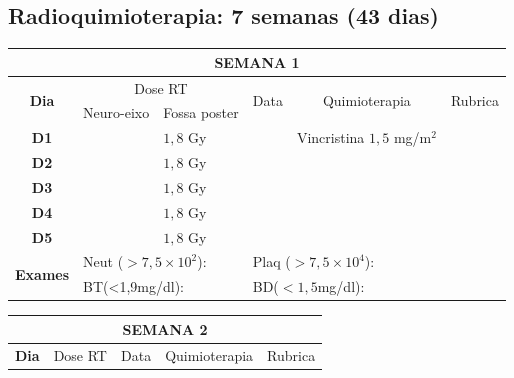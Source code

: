 \documentclass[11pt,a4paper,oldfontcommands]{memoir}
\begin{document}
\subsection{Radioquimioterapia: 7 semanas (43 dias)}

\begin{center}
\begin{tabular}{p{1cm}p{2cm}|p{2cm}|p{1cm}|p{4cm}|p{3cm}}
	\hline
	\multicolumn{6}{c}{\textbf{SEMANA 1}}\\
\hline
    \multicolumn{1}{c|}{\multirow{2}{*}{\textbf{Dia}}}&\multicolumn{2}{c|}{Dose RT}&\multicolumn{1}{c|}{\multirow{2}{*}{Data}}&\multicolumn{1}{c|}{\multirow{2}{*}{Quimioterapia}}&\multicolumn{1}{c}{\multirow{2}{*}{Rubrica}} \\
    \cline{2-3}
    \multicolumn{1}{c|}{\multirow{1}{*}{}}&{Neuro-eixo}&{Fossa poster}&& \\
	\hline
	\multicolumn{1}{c|}{\multirow{1}{*}{\textbf{D1}}}&\multicolumn{1}{c|}{}&{\(1,8\) Gy}&&{Vincristina \(1,5\) mg/m\(^2\)}&\\
    \multicolumn{1}{c|}{\multirow{1}{*}{\textbf{D2}}}&\multicolumn{1}{c|}{}&{\(1,8\) Gy}&&{}&\\
    \multicolumn{1}{c|}{\multirow{1}{*}{\textbf{D3}}}&\multicolumn{1}{c|}{}&{\(1,8\) Gy}&&{}&\\
    \multicolumn{1}{c|}{\multirow{1}{*}{\textbf{D4}}}&\multicolumn{1}{c|}{}&{\(1,8\) Gy}&&{}&\\
    \multicolumn{1}{c|}{\multirow{1}{*}{\textbf{D5}}}&\multicolumn{1}{c|}{}&{\(1,8\) Gy}&&{}&\\
    \hline
    \multicolumn{1}{c|}{\multirow{2}{*}{\textbf{Exames}}}&\multicolumn{2}{l|}{Neut (\(>7,5\times10^2\)):}&\multicolumn{2}{l|}{Plaq (\(>7,5\times10^4\)):}&\\
    \cline{2-6}
    \multicolumn{1}{c|}{\multirow{2}{*}{{}}}&\multicolumn{2}{l|}{BT(<1,9mg/dl):}&\multicolumn{2}{l|}{BD(\(<1,5\)mg/dl):}&
    \\
    \hline
\end{tabular}
\clearpage
\begin{table}[H]
\begin{tabular}{p{1cm}p{2cm}|p{2cm}|p{1cm}|p{4cm}|p{3cm}}
	\hline
	\multicolumn{6}{c}{\textbf{SEMANA 2}}\\
\hline
    \multicolumn{1}{c|}{\multirow{2}{*}{\textbf{Dia}}}&\multicolumn{2}{c|}{Dose RT}&\multicolumn{1}{c|}{\multirow{2}{*}{Data}}&\multicolumn{1}{c|}{\multirow{2}{*}{Quimioterapia}}&\multicolumn{1}{c}{\multirow{2}{*}{Rubrica}} \\

\end{tabular}
\end{table}
\end{center}
\end{document}
